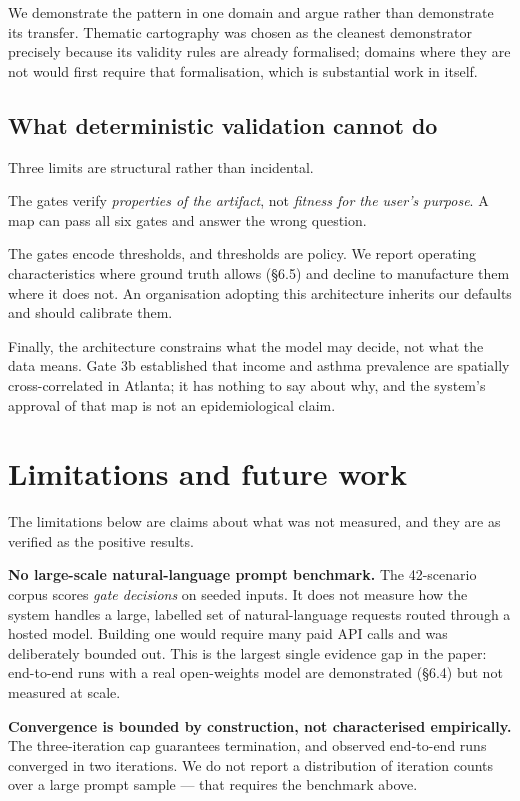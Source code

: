 We demonstrate the pattern in one domain and argue rather than demonstrate its transfer. Thematic cartography was chosen as the cleanest demonstrator precisely because its validity rules are already formalised; domains where they are not would first require that formalisation, which is substantial work in itself.

\subsection{What deterministic validation cannot do}
Three limits are structural rather than incidental.

The gates verify \emph{properties of the artifact}, not \emph{fitness for the user's purpose}. A map can pass all six gates and answer the wrong question.

The gates encode thresholds, and thresholds are policy. We report operating characteristics where ground truth allows (\S{}6.5) and decline to manufacture them where it does not. An organisation adopting this architecture inherits our defaults and should calibrate them.

Finally, the architecture constrains what the model may decide, not what the data means. Gate 3b established that income and asthma prevalence are spatially cross-correlated in Atlanta; it has nothing to say about why, and the system's approval of that map is not an epidemiological claim.

\section{Limitations and future work}
The limitations below are claims about what was not measured, and they are as verified as the positive results.

\textbf{No large-scale natural-language prompt benchmark.} The 42-scenario corpus scores \emph{gate decisions} on seeded inputs. It does not measure how the system handles a large, labelled set of natural-language requests routed through a hosted model. Building one would require many paid API calls and was deliberately bounded out. This is the largest single evidence gap in the paper: end-to-end runs with a real open-weights model are demonstrated (\S{}6.4) but not measured at scale.

\textbf{Convergence is bounded by construction, not characterised empirically.} The three-iteration cap guarantees termination, and observed end-to-end runs converged in two iterations. We do not report a distribution of iteration counts over a large prompt sample --- that requires the benchmark above.

